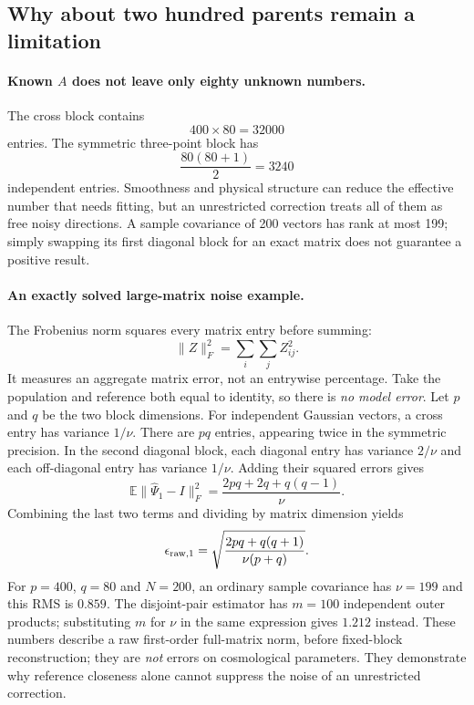 \documentclass[11pt]{article}
\newcommand{\E}{\mathbb{E}}
\begin{document}
\subsection{Why about two hundred parents remain a limitation}

\paragraph{Known $A$ does not leave only eighty unknown numbers.}
The cross block contains
\begin{equation}
 400\times80=32000
\end{equation}
entries. The symmetric three-point block has
\begin{equation}
 \frac{80(80+1)}{2}=3240
\end{equation}
independent entries. Smoothness and physical structure can reduce the
effective number that needs fitting, but an unrestricted correction treats
all of them as free noisy directions. A sample covariance of 200 vectors
has rank at most 199; simply swapping its first diagonal block for an
exact matrix does not guarantee a positive result.

\paragraph{An exactly solved large-matrix noise example.}
The Frobenius norm squares every matrix entry before summing:
\begin{equation}
 \|Z\|_F^2=\sum_i\sum_j Z_{ij}^2.
\end{equation}
It measures an aggregate matrix error, not an entrywise percentage.
Take the population and reference both equal to identity, so there is
\emph{no model error}. Let $p$ and $q$ be the two block dimensions.
For independent Gaussian vectors, a cross entry has variance $1/\nu$.
There are $pq$ entries, appearing twice in the symmetric precision.
In the second diagonal block, each diagonal entry has variance $2/\nu$
and each off-diagonal entry has variance $1/\nu$. Adding their squared
errors gives
\begin{equation}
 \E\|\widehat\Psi_1-I\|_F^2
 =\frac{2pq+2q+q(q-1)}{\nu}.
\end{equation}
Combining the last two terms and dividing by matrix dimension yields
\begin{equation}
 \epsilon_{\rm raw,1}
 =\sqrt{\frac{2pq+q(q+1)}{\nu(p+q)}}.
\end{equation}
For $p=400$, $q=80$ and $N=200$, an ordinary sample covariance has
$\nu=199$ and this RMS is $0.859$. The disjoint-pair estimator has
$m=100$ independent outer products; substituting $m$ for $\nu$ in the
same expression gives $1.212$ instead. These
numbers describe a raw first-order full-matrix norm, before fixed-block
reconstruction; they are \emph{not} errors on cosmological parameters.
They demonstrate why reference closeness alone cannot suppress the noise
of an unrestricted correction.
\end{document}
